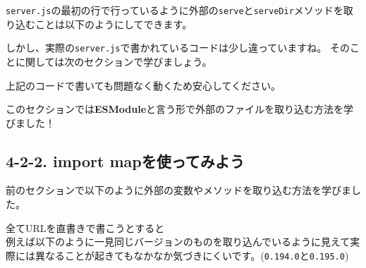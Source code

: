 \texttt{server.js}の最初の行で行っているように外部の\texttt{serve}と\texttt{serveDir}メソッドを取り込むことは以下のようにしてできます。

\begin{Shaded}
\begin{Highlighting}[]
 \OperatorTok{;}
 \OperatorTok{;}
\end{Highlighting}
\end{Shaded}

しかし、実際の\texttt{server.js}で書かれているコードは少し違っていますね。
そのことに関しては次のセクションで学びましょう。

上記のコードで書いても問題なく動くため安心してください。

このセクションでは\textbf{ESModule}と言う形で外部のファイルを取り込む方法を学びました！

\subsection{4-2-2. import
mapを使ってみよう}\label{import-mapux3092ux4f7fux3063ux3066ux307fux3088ux3046}

前のセクションで以下のように外部の変数やメソッドを取り込む方法を学びました。

\begin{Shaded}
\begin{Highlighting}[]
 \OperatorTok{;}
 \OperatorTok{;}
\end{Highlighting}
\end{Shaded}

全てURLを直書きで書こうとすると\\
例えば以下のように一見同じバージョンのものを取り込んでいるように見えて実際には異なることが起きてもなかなか気づきにくいです。(\texttt{0.194.0}と\texttt{0.195.0})

\begin{Shaded}
\begin{Highlighting}[]
 \OperatorTok{;}
 \OperatorTok{;}
\end{Highlighting}
\end{Shaded}

